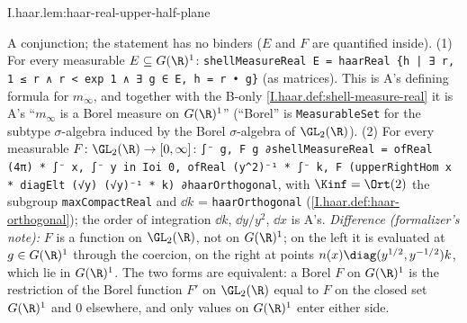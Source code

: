 \begin{lemma}
\end{lemma}
\begin{tfformal}{I.haar.lem:haar-real-upper-half-plane}
\begin{tffidelity}
A conjunction; the statement has no binders ($E$ and $F$ are quantified inside). (1) For every measurable $E\subseteq G(\R)^1$: \texttt{shellMeasureReal E = haarReal \{h | ∃ r, 1 ≤ r ∧ r < exp 1 ∧ ∃ g ∈ E, h = r • g\}} (as matrices). This is A's defining formula for $m_\infty$, and together with the B-only \cref{I.haar.def:shell-measure-real} it is A's ``$m_\infty$ is a Borel measure on $G(\R)^1$'' (``Borel'' is \texttt{MeasurableSet} for the subtype $\sigma$-algebra induced by the Borel $\sigma$-algebra of $\GL_2(\R)$). (2) For every measurable $F\colon\GL_2(\R)\to[0,\infty]$: \texttt{∫⁻ g, F g ∂shellMeasureReal = ofReal (4π) * ∫⁻ x, ∫⁻ y in Ioi 0, ofReal (y\textasciicircum2)⁻¹ * ∫⁻ k, F (upperRightHom x * diagElt (√y) (√y)⁻¹ * k) ∂haarOrthogonal}, with $\Kinf=\Ort(2)$ the subgroup \texttt{maxCompactReal} and $\dd k$ = \texttt{haarOrthogonal} (\cref{I.haar.def:haar-orthogonal}); the order of integration $\dd k$, $\dd y/y^2$, $\dd x$ is A's. \emph{Difference (formalizer's note):} $F$ is a function on $\GL_2(\R)$, not on $G(\R)^1$; on the left it is evaluated at $g\in G(\R)^1$ through the coercion, on the right at points $n(x)\diag(y^{1/2},y^{-1/2})k$, which lie in $G(\R)^1$. The two forms are equivalent: a Borel $F$ on $G(\R)^1$ is the restriction of the Borel function $F'$ on $\GL_2(\R)$ equal to $F$ on the closed set $G(\R)^1$ and $0$ elsewhere, and only values on $G(\R)^1$ enter either side.
\end{tffidelity}
\end{tfformal}
